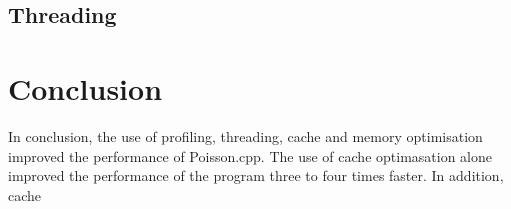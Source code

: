 \documentclass[a4paper, 12pt]{article}
\begin{document}
\subsection{Threading}
	
	
\section{Conclusion}
In conclusion, the use of profiling, threading, cache and memory optimisation improved the performance of  Poisson.cpp. The use of cache optimasation alone improved the performance of the program three to four times faster. In addition, cache 
\end{document}
